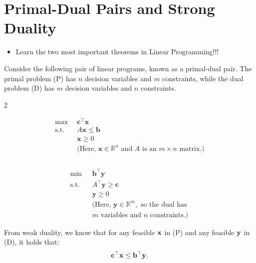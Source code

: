 \section{Primal-Dual Pairs and Strong Duality}
\begin{outcome}
\begin{itemize}
\item Learn the two most important theorems in Linear Programming!!!
\end{itemize}
\end{outcome}
Consider the following pair of linear programs, known as a primal-dual pair. The primal problem (P) has $n$ decision variables and $m$ constraints, while the dual problem (D) has $m$ decision variables and $n$ constraints.
\begin{multicols}{2}
\begin{tcolorbox}[title=Primal (P), colback=blue!5, colframe=blue!60!black, sharp corners=south]
\[
\begin{aligned}
\max\ & \mathbf{c}^\top \mathbf{x} \\
\text{s.t.} \quad & A \mathbf{x} \leq \mathbf{b} \\
& \mathbf{x} \geq 0 \\
& \text{(Here, } \mathbf{x} \in \mathbb{R}^n \text{ and } A \text{ is an } m \times n \text{ matrix.)}
\\
\phantom{} \\
\end{aligned}
\]
\end{tcolorbox}

\columnbreak

\begin{tcolorbox}[title=Dual (D), colback=green!5, colframe=green!60!black, sharp corners=south]
\[
\begin{aligned}
\min\ & \mathbf{b}^\top \mathbf{y} \\
\text{s.t.} \quad & A^\top \mathbf{y} \geq \mathbf{c} \\
& \mathbf{y} \geq 0 \\
& \text{(Here, } \mathbf{y} \in \mathbb{R}^m, \text{ so the dual has } \\
& m \text{ variables and } n \text{ constraints.)}
\end{aligned}
\]
\end{tcolorbox}
\end{multicols}

From weak duality, we know that for any feasible $\mathbf{x}$ in (P) and any feasible $\mathbf{y}$ in (D), it holds that:
\[
\mathbf{c}^\top \mathbf{x} \leq \mathbf{b}^\top \mathbf{y}.
\]

